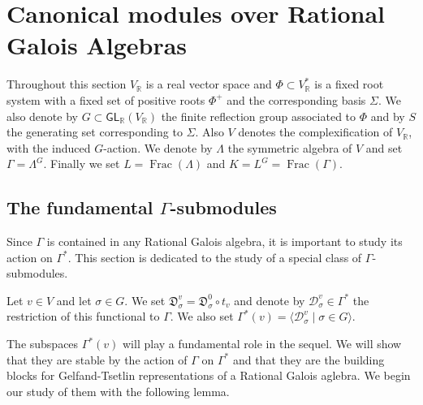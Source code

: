 \documentclass[11pt,fleqn]{article}
\newcommand\RR{\mathbb R}
\newcommand\D{\mathfrak D}
\newcommand\DD{\mathcal D}
\DeclareMathOperator\Frac{Frac}
\begin{document}
\newpage
\section{Canonical modules over Rational Galois Algebras}
Throughout this section $V_\RR$ is a real vector space and $\Phi \subset 
V_\RR^*$ is a fixed root system with a fixed set of positive roots $\Phi^+$
and the corresponding basis $\Sigma$. We also denote by $G \subset 
\mathsf{GL}_\RR(V_\RR)$ the finite reflection group associated to $\Phi$
and by $S$ the generating set corresponding to $\Sigma$. Also $V$ denotes
the complexification of $V_\RR$, with the induced $G$-action. We denote by
$\Lambda$ the symmetric algebra of $V$ and set $\Gamma = \Lambda^G$. Finally
we set $L = \Frac(\Lambda)$ and $K = L^G = \Frac(\Gamma)$.

\subsection*{The fundamental $\Gamma$-submodules}
Since $\Gamma$ is contained in any Rational Galois algebra, it is important
to study its action on $\Gamma^*$. This section is dedicated to the study of
a special class of $\Gamma$-submodules.

\begin{Definition}
\label{D:fundamental-subspace}
Let $v \in V$ and let $\sigma \in G$. We set $\D_\sigma^v = \D_\sigma^0 \circ
t_v$ and denote by $\DD^v_\sigma \in \Gamma^*$ the restriction of this 
functional to $\Gamma$. We also set $\Gamma^*(v) = \langle \DD_\sigma^v \mid 
\sigma \in G \rangle$.
\end{Definition}
The subspaces $\Gamma^*(v)$ will play a fundamental role in the sequel.
We will show that they are stable by the action of $\Gamma$ on $\Gamma^*$
and that they are the building blocks for Gelfand-Tsetlin representations of
a Rational Galois aglebra. We begin our study of them with the following lemma.
\end{document}
